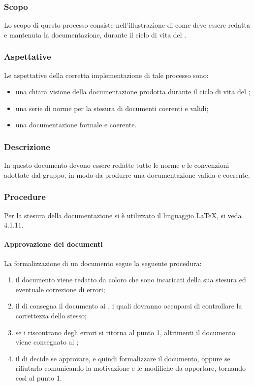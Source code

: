 \subsubsection{Scopo}
Lo scopo di questo processo consiste nell'illustrazione di come deve essere redatta e mantenuta
la documentazione, durante il ciclo di vita del .
\subsubsection{Aspettative}
Le aspettative della corretta implementazione di tale processo sono:
\begin{itemize}
	\item una chiara visione della documentazione prodotta durante il ciclo di vita
del ;
	\item una serie di norme per la stesura di documenti coerenti e validi;
	\item una documentazione formale e coerente.
\end{itemize}
\subsubsection{Descrizione}
In questo documento devono essere redatte tutte le norme e le convenzioni adottate dal gruppo,
in modo da produrre una documentazione valida e coerente.
\subsubsection{Procedure}
Per la stesura della documentazione si è utilizzato il linguaggio \LaTeX, si veda 4.1.11.
 \paragraph{Approvazione dei documenti}
La formalizzazione di un documento segue la seguente procedura:
\begin{enumerate}
	\item il documento viene redatto da coloro che sono incaricati della sua stesura ed eventuale correzione di errori;
	\item il \RESP{} di  consegna il documento ai \VERP, i quali dovranno occuparsi di controllare la correttezza dello stesso;
	\item se i \VERP{} riscontrano degli errori si ritorna al punto 1, altrimenti il documento viene consegnato al \RESP ;
	\item il \RESP{} di  decide se approvare, e quindi formalizzare il documento, oppure se rifiutarlo comunicando la motivazione e le modifiche da apportare, tornando così al punto 1.
\end{enumerate}

